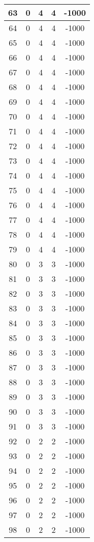 \documentclass[letterpaper, 12pt]{article}
\begin{document}
\begin{longtable}{|c|c|c|c|c|}
\hline
63 & 0 & 4 & 4 & -1000 \\
\hline
64 & 0 & 4 & 4 & -1000 \\
\hline
65 & 0 & 4 & 4 & -1000 \\
\hline
66 & 0 & 4 & 4 & -1000 \\
\hline
67 & 0 & 4 & 4 & -1000 \\
\hline
68 & 0 & 4 & 4 & -1000 \\
\hline
69 & 0 & 4 & 4 & -1000 \\
\hline
70 & 0 & 4 & 4 & -1000 \\
\hline
71 & 0 & 4 & 4 & -1000 \\
\hline
72 & 0 & 4 & 4 & -1000 \\
\hline
73 & 0 & 4 & 4 & -1000 \\
\hline
74 & 0 & 4 & 4 & -1000 \\
\hline
75 & 0 & 4 & 4 & -1000 \\
\hline
76 & 0 & 4 & 4 & -1000 \\
\hline
77 & 0 & 4 & 4 & -1000 \\
\hline
78 & 0 & 4 & 4 & -1000 \\
\hline
79 & 0 & 4 & 4 & -1000 \\
\hline
80 & 0 & 3 & 3 & -1000 \\
\hline
81 & 0 & 3 & 3 & -1000 \\
\hline
82 & 0 & 3 & 3 & -1000 \\
\hline
83 & 0 & 3 & 3 & -1000 \\
\hline
84 & 0 & 3 & 3 & -1000 \\
\hline
85 & 0 & 3 & 3 & -1000 \\
\hline
86 & 0 & 3 & 3 & -1000 \\
\hline
87 & 0 & 3 & 3 & -1000 \\
\hline
88 & 0 & 3 & 3 & -1000 \\
\hline
89 & 0 & 3 & 3 & -1000 \\
\hline
90 & 0 & 3 & 3 & -1000 \\
\hline
91 & 0 & 3 & 3 & -1000 \\
\hline
92 & 0 & 2 & 2 & -1000 \\
\hline
93 & 0 & 2 & 2 & -1000 \\
\hline
94 & 0 & 2 & 2 & -1000 \\
\hline
95 & 0 & 2 & 2 & -1000 \\
\hline
96 & 0 & 2 & 2 & -1000 \\
\hline
97 & 0 & 2 & 2 & -1000 \\
\hline
98 & 0 & 2 & 2 & -1000 \\

\end{longtable}
\end{document}
